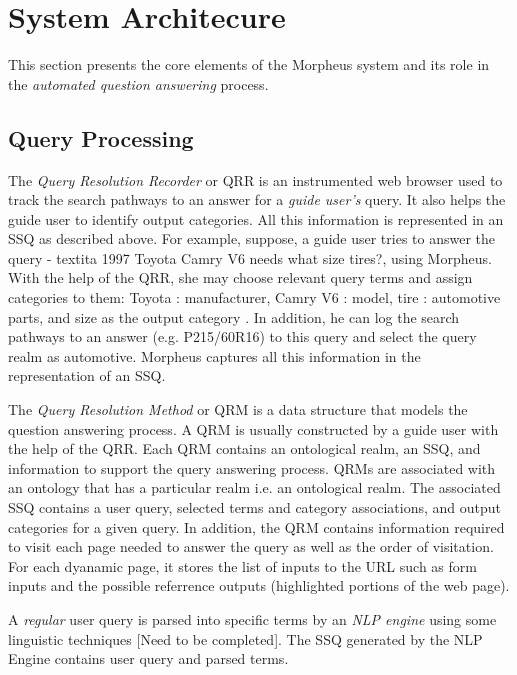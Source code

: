 \section{System Architecure}
\label{sec:systemarch}

This section presents the core elements of the Morpheus system and its 
role in the \textit{automated question answering} process. 

\subsection{Query Processing}
  
The \textit{Query Resolution Recorder} or QRR is an instrumented web browser
used to track the search pathways to an answer for a \textit{guide user's} query. It
also helps the guide user to identify output categories. All this information
is represented in an SSQ as described above. For example, suppose, a guide user
tries to answer the query - textit{a 1997 Toyota Camry V6 needs what size tires?}, using
Morpheus. With the help of the QRR, she may choose relevant query terms and assign
categories to them: Toyota : manufacturer, Camry V6 : 
model, tire : automotive parts, and size as the output category
. In addition, he can log the search pathways to an answer (e.g. P215/60R16)
to this query and select the query realm as automotive. Morpheus captures all
this information in the representation of an SSQ.     


The \textit{Query Resolution Method} or QRM is a data structure that models the
question answering process. A QRM is usually constructed by a guide user with
the help of the QRR. Each QRM contains an ontological realm, an SSQ, and
information to support the query answering process. QRMs are associated with an
ontology that
has a particular realm i.e. an ontological realm. The associated SSQ contains a
user query, selected terms and category associations, and output categories for
a given query. In addition, the QRM contains information required to visit each
page needed to answer the query as well as the order of visitation. For each
dyanamic page, it stores the list of inputs to the URL such as form inputs and
the possible referrence outputs (highlighted portions of the web page).



A \textit{regular} user query is parsed into specific terms by an \textit{NLP
engine} using
some linguistic techniques [Need to be completed]. The SSQ generated by the NLP
Engine contains user query and parsed terms. 


